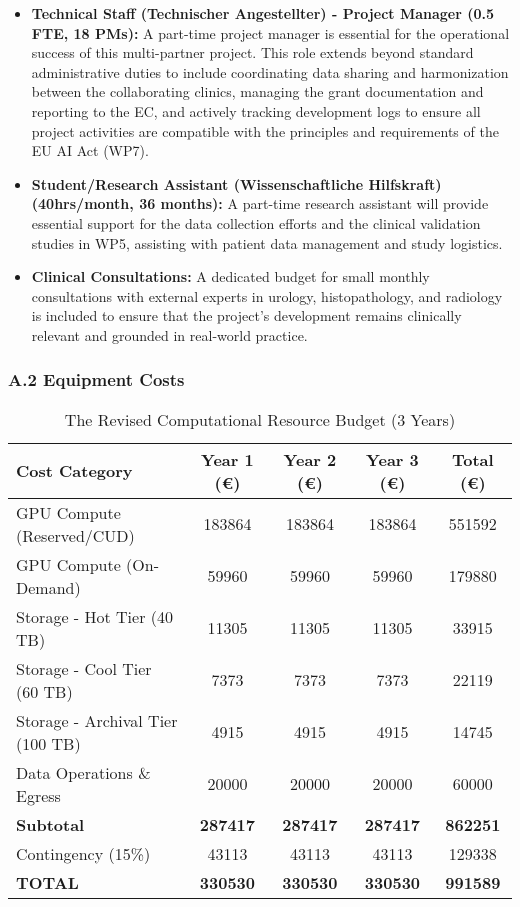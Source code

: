 \begin{itemize}
    \item \textbf{Technical Staff (Technischer Angestellter) - Project Manager (0.5 FTE, 18 PMs):} A part-time project manager is essential for the operational success of this multi-partner project. This role extends beyond standard administrative duties to include coordinating data sharing and harmonization between the collaborating clinics, managing the grant documentation and reporting to the EC, and actively tracking development logs to ensure all project activities are compatible with the principles and requirements of the EU AI Act (WP7).
    \item \textbf{Student/Research Assistant (Wissenschaftliche Hilfskraft) (40hrs/month, 36 months):} A part-time research assistant will provide essential support for the data collection efforts and the clinical validation studies in WP5, assisting with patient data management and study logistics.
    \item \textbf{Clinical Consultations:} A dedicated budget for small monthly consultations with external experts in urology, histopathology, and radiology is included to ensure that the project's development remains clinically relevant and grounded in real-world practice.
\end{itemize}

\subsubsection*{A.2 Equipment Costs}

\begin{table}[H]
\centering
\caption{The Revised Computational Resource Budget (3 Years)}
\label{tab:computational_budget}
\begin{tabular}{lS[table-format=7.0]S[table-format=7.0]S[table-format=7.0]S[table-format=7.0]}
\toprule
\textbf{Cost Category} & {\textbf{Year 1 (€)}} & {\textbf{Year 2 (€)}} & {\textbf{Year 3 (€)}} & {\textbf{Total (€)}} \\
\midrule
GPU Compute (Reserved/CUD) & 183864 & 183864 & 183864 & 551592 \\
GPU Compute (On-Demand) & 59960 & 59960 & 59960 & 179880 \\
Storage - Hot Tier (40 TB) & 11305 & 11305 & 11305 & 33915 \\
Storage - Cool Tier (60 TB) & 7373 & 7373 & 7373 & 22119 \\
Storage - Archival Tier (100 TB) & 4915 & 4915 & 4915 & 14745 \\
Data Operations \& Egress & 20000 & 20000 & 20000 & 60000 \\
\midrule
\textbf{Subtotal} & \textbf{287417} & \textbf{287417} & \textbf{287417} & \textbf{862251} \\
\midrule
Contingency (15\%) & 43113 & 43113 & 43113 & 129338 \\
\midrule
\textbf{TOTAL} & \textbf{330530} & \textbf{330530} & \textbf{330530} & \textbf{991589} \\
\bottomrule
\end{tabular}
\end{table}

